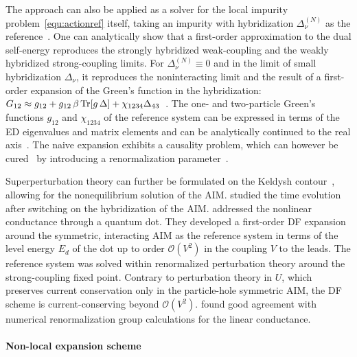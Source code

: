 \documentclass[rmp,aps,reprint,amsmath,amssymb,superscriptaddress,showpacs,nofootinbib]{revtex4-1}
\begin{document}
The approach can also be applied as a solver for the local impurity problem~\eqref{equ:actionref} itself, taking an impurity with hybridization $\Delta^{(N)}_{\nu}$ as the reference~\cite{Hafermann2009b}. One can analytically show that a first-order approximation to the dual self-energy reproduces the strongly hybridized weak-coupling and the weakly hybridized strong-coupling limits. For $\Delta^{(N)}_{\nu}\equiv 0$  and in the limit of small hybridization $\Delta_{\nu}$, it reproduces the noninteracting limit and the result of a first-order expansion of the Green's function in the hybridization: $G_{12} \approx g_{12} + g_{12}\, \beta\, {\rm Tr}[g\,\Delta] + \chi_{1234}\Delta_{43}$~\cite{Dai2005}. The one- and two-particle Green's functions $g_{12}$ and $\chi_{1234}$ of the reference system can be expressed in terms of the ED eigenvalues and matrix elements and can be analytically continued to the real axis~\cite{Jung2011}. The naive expansion exhibits a causality problem, which can however be cured~\cite{Jung2010} by introducing a renormalization parameter~\cite{Krivenko2010}.

Superperturbation theory can further be formulated on the Keldysh contour~\cite{Jung2012}, allowing 
for the nonequilibrium solution of the AIM.  studied the time evolution after switching on the hybridization of the AIM.  addressed the nonlinear conductance through a quantum dot. They developed a first-order DF expansion around the symmetric, interacting AIM as the reference system in terms of the level energy $E_{d}$ of the dot up to order $\mathcal{O}(V^{2})$ in the coupling $V$ to the leads. The reference system was solved within renormalized perturbation theory around the strong-coupling fixed point. Contrary to perturbation theory in $U$, which preserves current conservation only in the particle-hole symmetric AIM, the DF scheme is current-conserving beyond $\mathcal{O}(V^{2})$.  found good agreement with numerical renormalization group calculations for the linear conductance.

\paragraph{Non-local expansion scheme}
\label{sec:nonlocalexp}
\end{document}
